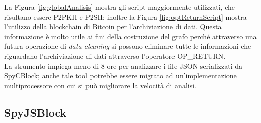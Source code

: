 La Figura \ref{fig:globalAnalisis} mostra gli script maggiormente utilizzati, che risultano essere P2PKH e  P2SH; inoltre la Figura \ref{fig:optReturnScript} mostra l'utilizzo della blockchain di Bitcoin per l'archiviazione di dati. Questa informazione è molto utile ai fini della costruzione del grafo perché attraverso una futura operazione di \emph{data cleaning} si possono eliminare tutte le informazioni che riguardano l'archiviazione di dati attraverso l'operatore OP\_RETURN.\\
La strumento impiega meno di 8 ore per analizzare i file JSON serializzati da SpyCBlock; anche tale tool potrebbe essere migrato ad un'implementazione multiprocessore con cui si può migliorare la velocità di analisi.

\subsection{SpyJSBlock} \label{sec:SpyJSBlock}

